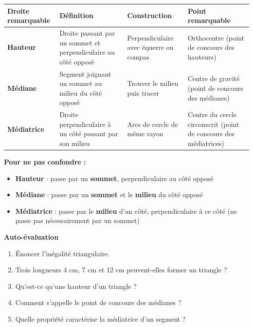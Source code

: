 \begin{center}
	\begin{tabular}{|p{3cm}|p{4.5cm}|p{4.5cm}|p{3cm}|}
		\hline
		\textbf{Droite remarquable} & \textbf{Définition} & \textbf{Construction} & \textbf{Point remarquable} \\
		\hline
		\textbf{Hauteur} & Droite passant par un sommet et perpendiculaire au côté opposé & Perpendiculaire avec équerre ou compas & Orthocentre (point de concours des hauteurs) \\
		\hline
		\textbf{Médiane} & Segment joignant un sommet au milieu du côté opposé & Trouver le milieu puis tracer & Centre de gravité (point de concours des médianes) \\
		\hline
		\textbf{Médiatrice} & Droite perpendiculaire à un côté passant par son milieu & Arcs de cercle de même rayon & Centre du cercle circonscrit (point de concours des médiatrices) \\
		\hline
	\end{tabular}
\end{center}

\begin{astucebox}
	\textbf{Pour ne pas confondre :}
	\begin{itemize}
		\item \textbf{Hauteur} : passe par un \textbf{sommet}, perpendiculaire au côté opposé
		\item \textbf{Médiane} : passe par un \textbf{sommet} et le \textbf{milieu} du côté opposé
		\item \textbf{Médiatrice} : passe par le \textbf{milieu} d'un côté, perpendiculaire à ce côté (ne passe pas nécessairement par un sommet)
	\end{itemize}
\end{astucebox}

\begin{quizbox}
	\textbf{Auto-évaluation}
	\begin{enumerate}[label=\arabic*)]
		\item Énoncer l'inégalité triangulaire.
		\item Trois longueurs 4 cm, 7 cm et 12 cm peuvent-elles former un triangle ?
		\item Qu'est-ce qu'une hauteur d'un triangle ?
		\item Comment s'appelle le point de concours des médianes ?
		\item Quelle propriété caractérise la médiatrice d'un segment ?
	\end{enumerate}
\end{quizbox}

